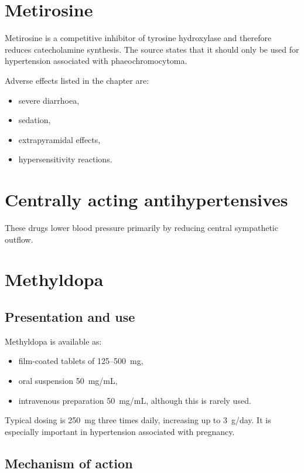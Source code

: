 \documentclass[11pt,a4paper]{article}
\begin{document}
\section{Metirosine}

Metirosine is a competitive inhibitor of tyrosine hydroxylase and therefore reduces catecholamine synthesis. The source states that it should only be used for hypertension associated with phaeochromocytoma.

Adverse effects listed in the chapter are:
\begin{itemize}
    \item severe diarrhoea,
    \item sedation,
    \item extrapyramidal effects,
    \item hypersensitivity reactions.
\end{itemize}

\section{Centrally acting antihypertensives}

These drugs lower blood pressure primarily by reducing central sympathetic outflow.

\section{Methyldopa}

\subsection{Presentation and use}

Methyldopa is available as:
\begin{itemize}
    \item film-coated tablets of 125--500~mg,
    \item oral suspension 50~mg/mL,
    \item intravenous preparation 50~mg/mL, although this is rarely used.
\end{itemize}

Typical dosing is 250~mg three times daily, increasing up to 3~g/day. It is especially important in hypertension associated with pregnancy.

\subsection{Mechanism of action}
\end{document}

